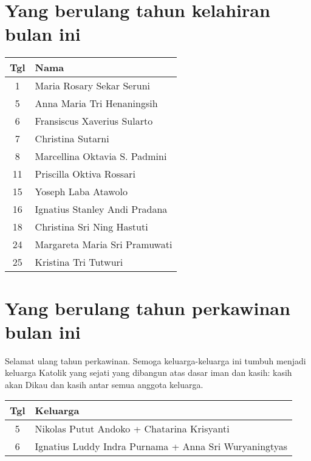 

\section*{Yang berulang tahun kelahiran bulan ini}


\begin{longtable}{|c|l|} 
\hline
Tgl & Nama \\ \hline
\endhead1& Maria Rosary Sekar Seruni\\
5& Anna Maria Tri Henaningsih\\
6& Fransiscus Xaverius Sularto\\
7& Christina Sutarni\\
8& Marcellina Oktavia S. Padmini\\
11& Priscilla Oktiva Rossari\\
15& Yoseph Laba Atawolo\\
16& Ignatius Stanley Andi Pradana\\
18& Christina Sri Ning Hastuti\\
24& Margareta Maria Sri Pramuwati\\
25& Kristina Tri Tutwuri\\
\hline
\end{longtable}



\section*{Yang berulang tahun perkawinan  bulan ini}

Selamat ulang tahun perkawinan. Semoga keluarga-keluarga ini tumbuh menjadi keluarga Katolik yang sejati yang dibangun atas dasar iman dan kasih: kasih akan Dikau dan kasih antar semua anggota keluarga.

\begin{longtable}{|c|l|} 
\hline
Tgl & Keluarga \\ \hline
\endhead5& Nikolas Putut Andoko + Chatarina Krisyanti\\
6& Ignatius Luddy Indra Purnama + Anna Sri Wuryaningtyas\\
\hline
\end{longtable} 
